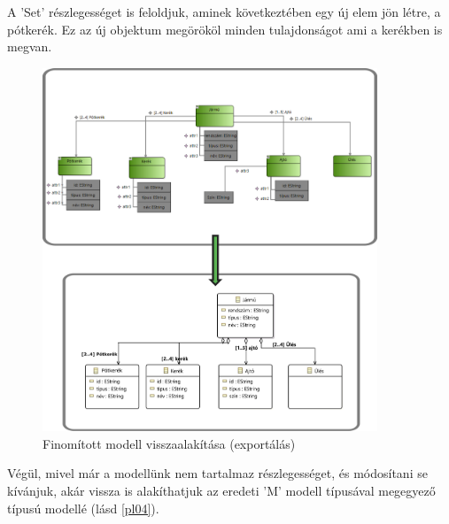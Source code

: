 A 'Set' részlegességet is feloldjuk, aminek következtében egy új elem jön létre, a pótkerék. Ez az új objektum megörököl minden tulajdonságot ami a kerékben is megvan.
\begin{figure}[!ht]
	\centering
	\includegraphics[width=100mm]{figures/pl04.pdf}
	\caption{Finomított modell visszaalakítása (exportálás)} 
	\label{pl04}
\end{figure}
\par
Végül, mivel már a modellünk nem tartalmaz részlegességet, és módosítani se kívánjuk, akár vissza is alakíthatjuk az eredeti 'M' modell típusával megegyező típusú modellé (lásd \autoref{pl04}).